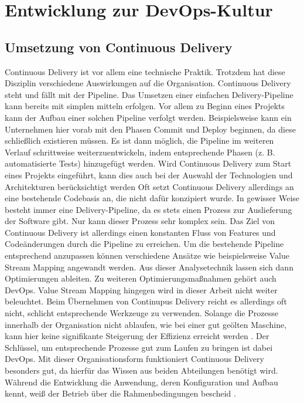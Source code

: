 \section{Entwicklung zur DevOps-Kultur} \label{entwicklung}

\subsection{Umsetzung von Continuous Delivery}
Continuous Delivery ist vor allem eine technische Praktik. Trotzdem hat diese Disziplin verschiedene Auswirkungen auf die Organisation. Continuous Delivery steht und fällt mit der Pipeline. Das Umsetzen einer einfachen Delivery-Pipeline kann bereits mit simplen mitteln erfolgen. Vor allem zu Beginn eines Projekts kann der Aufbau einer solchen Pipeline verfolgt werden. Beispielsweise kann ein Unternehmen hier vorab mit den Phasen Commit und Deploy beginnen, da diese schließlich existieren müssen. Es ist dann möglich, die Pipeline im weiteren Verlauf schrittweise weiterzuentwickeln, indem entsprechende Phasen (z. B. automatisierte Tests) hinzugefügt werden. Wird Continuous Delivery zum Start eines Projekts eingeführt, kann dies auch bei der Auswahl der Technologien und Architekturen berücksichtigt werden \cite{Wolff.2016} 
Oft setzt Continuous Delivery allerdings an eine bestehende Codebasis an, die nicht dafür konzipiert wurde. In gewisser Weise besteht immer eine Delivery-Pipeline, da es stets einen Prozess zur Auslieferung der Software gibt. Nur kann dieser Prozess sehr komplex sein. Das Ziel von Continuous Delivery ist allerdings einen konstanten Fluss von Features und Codeänderungen durch die Pipeline zu erreichen. Um die bestehende Pipeline entsprechend anzupassen können verschiedene Ansätze wie beispielsweise Value Stream Mapping angewandt werden. Aus dieser Analysetechnik lassen sich dann Optimierungen ableiten. Zu weiteren Optimierungsmaßnahmen gehört auch DevOps. Value Stream Mapping hingegen wird in dieser Arbeit nicht weiter beleuchtet. 
Beim Übernehmen von Continupus Delivery reicht es allerdings oft nicht, schlicht entsprechende Werkzeuge zu verwenden. Solange die Prozesse innerhalb der Organisation nicht ablaufen, wie bei einer gut geölten Maschine, kann hier keine signifikante Steigerung der Effizienz erreicht werden \cite{Virmani.2015}. Der Schlüssel, um entsprechende Prozesse gut zum Laufen zu bringen ist dabei DevOps. Mit dieser Organisationsform funktioniert Continuous Delivery besonders gut, da hierfür das Wissen aus beiden Abteilungen benötigt wird. Während die Entwicklung die Anwendung, deren Konfiguration und Aufbau kennt, weiß der Betrieb über die Rahmenbedingungen bescheid \cite{Wolff.2016}.

